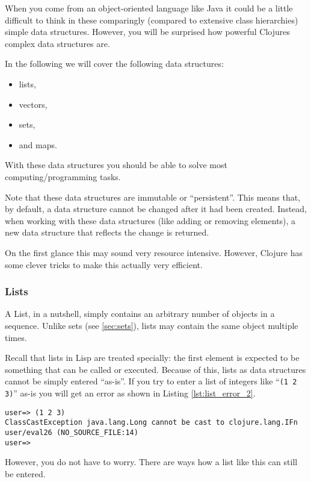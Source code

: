 When you come from an object-oriented language like Java it could be a little difficult to think in these comparingly (compared to extensive class hierarchies) simple data structures.
However, you will be surprised how powerful Clojures complex data structures are.

In the following we will cover the following data structures:
\begin{itemize}
  \item lists,
  \item vectors,
  \item sets,
  \item and maps.
\end{itemize}
With these data structures you should be able to solve most computing/programming tasks.

Note that these data structures are immutable or ``persistent''.
This means that, by default, a data structure cannot be changed after it had been created.
Instead, when working with these data structures (like adding or removing elements), a new data structure that reflects the change is returned.

On the first glance this may sound very resource intensive.
However, Clojure has some clever tricks to make this actually very efficient.

\subsubsection{Lists}
A List, in a nutshell, simply contains an arbitrary number of objects in a sequence.
Unlike sets (see \vref{sec:sets}), lists may contain the same object multiple times.

Recall that lists in Lisp are treated specially:
the first element is expected to be something that can be called or executed.
Because of this, lists as data structures cannot be simply entered ``as-is''.
If you try to enter a list of integers like ``\texttt{(1 2 3)}'' as-is you will get an error as shown in Listing \vref{lst:list_error_2}.

\begin{lstlisting}[label=lst:list_error_2, caption=Error on Entering a List ``as-is'']
user=> (1 2 3)
ClassCastException java.lang.Long cannot be cast to clojure.lang.IFn  user/eval26 (NO_SOURCE_FILE:14)
user=> 
\end{lstlisting}

However, you do not have to worry.
There are ways how a list like this can still be entered.

